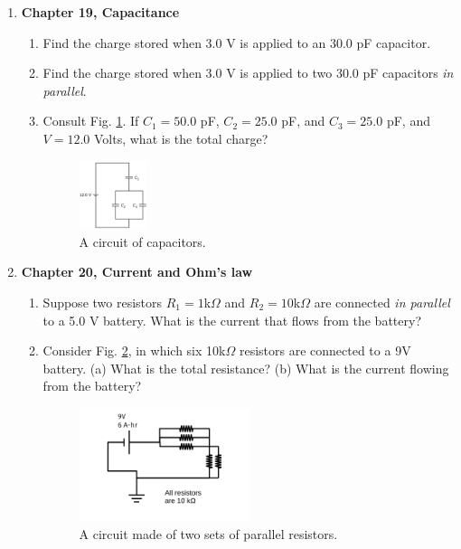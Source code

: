 \documentclass[10pt]{article}
\begin{document}
\begin{enumerate}
\begin{enumerate}
\end{enumerate}
\item \textbf{Chapter 19, Capacitance}
\begin{enumerate}
\item Find the charge stored when 3.0 V is applied to an 30.0 pF capacitor. \\ \vspace{1cm}
\item Find the charge stored when 3.0 V is applied to two 30.0 pF capacitors \textit{in parallel}. \\ \vspace{1cm}
\item Consult Fig. \ref{fig:cap2}.  If $C_1 = 50.0$ pF, $C_2 = 25.0$ pF, and $C_3 = 25.0$ pF, and $V=12.0$ Volts, what is the total charge? \\ \vspace{1.5cm}
\begin{figure}
\centering
\includegraphics[width=0.2\textwidth]{figures/cap2.png}
\caption{\label{fig:cap2} A circuit of capacitors.}
\end{figure}
\end{enumerate}
\item \textbf{Chapter 20, Current and Ohm's law}
\begin{enumerate}
\item Suppose two resistors $R_1=1$k$\Omega$ and $R_2=10$k$\Omega$ are connected \textit{in parallel} to a 5.0 V battery.  What is the current that flows from the battery? \\ \vspace{2cm}
\item Consider Fig. \ref{fig:r}, in which six 10k$\Omega$ resistors are connected to a 9V battery.  (a) What is the total resistance? (b) What is the current flowing from the battery?
\begin{figure}[hb]
\centering
\includegraphics[width=0.5\textwidth]{figures/circuitExample1.pdf}
\caption{\label{fig:r} A circuit made of two sets of parallel resistors.}
\end{figure}
\end{enumerate}
\end{enumerate}
\end{document}

